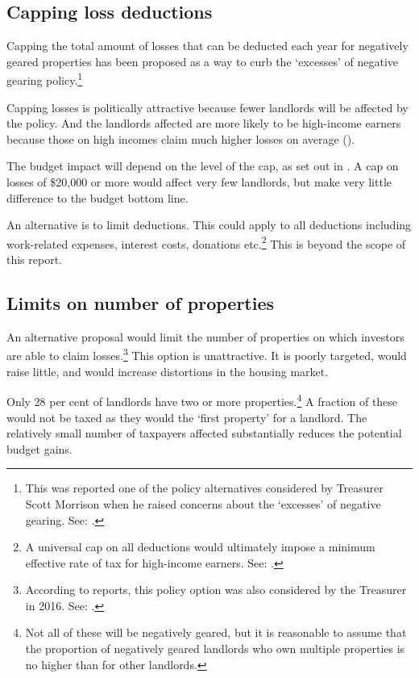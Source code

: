 \subsection{Capping loss deductions}
Capping the total amount of losses that can be deducted each year for negatively geared properties has been proposed as a way to curb the ‘excesses’ of negative gearing policy.\footnote{This was reported one of the policy alternatives considered by Treasurer Scott Morrison when he raised concerns about the ‘excesses’ of negative gearing. See: \textcite{Coorey2016}.}



Capping losses is politically attractive because fewer landlords will be affected by the policy. 
And the landlords affected are more likely to be high-income earners because those on high incomes claim much higher losses on average (). 

The budget impact will depend on the level of the cap, as set out in . A cap on losses of \$20,000 or more would affect very few landlords, but make very little difference to the budget bottom line.

An alternative is to limit deductions. This could apply to all deductions including work-related expenses, interest costs, donations etc.\footnote{A universal cap on all deductions would ultimately impose a minimum effective rate of tax for high-income earners. See: \textcite[][61]{BCA2016}.}  This is beyond the scope of this report. 

\subsection{Limits on number of properties}
An alternative proposal would limit the number of properties on which investors are able to claim losses.\footnote{According to reports, this policy option was also considered by the Treasurer in 2016. See: \textcite{Coorey2016}.}  This option is unattractive. It is poorly targeted, would raise little, and would increase distortions in the housing market.

Only 28 per cent of landlords have two or more properties.\footnote{\textcites{ABS2015-Survey-of-income-and-housing-2013-14}{HILDA2015} Not all of these will be negatively geared, but it is reasonable to assume that the proportion of negatively geared landlords who own multiple properties is no higher than for other landlords.} A fraction of these would not be taxed as they would the ‘first property’ for a landlord. The relatively small number of taxpayers affected substantially reduces the potential budget gains. 

